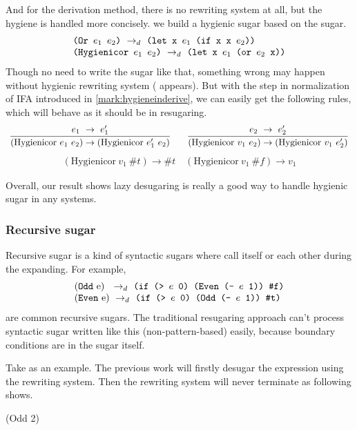 And for the derivation method, there is no rewriting system at all, but the hygiene is handled more concisely. we build a hygienic sugar  based on the  sugar.
\[
\begin{array}{l}
\texttt{(Or $e_1$ $e_2$)} ~\rightarrow_d~ \texttt{(let x $e_1$ (if x x $e_2$))}\\
\texttt{(Hygienicor $e_1$ $e_2$)} ~\rightarrow_d~ \texttt{(let x $e_1$ (or $e_2$ x))}
\end{array}
\]
Though no need to write the sugar like that, something wrong may happen without hygienic rewriting system ( appears). But with the step in normalization of IFA introduced in \ref{mark:hygieneinderive}, we can easily get the following rules, which will behave as it should be in resugaring.
\[
\begin{array}{c}
\infer {(\mbox{Hygienicor}~e_1~e_2) \rightarrow (\mbox{Hygienicor}~e_1'~e_2)} {e_1~ \rightarrow~e_1'}
\qquad
\infer {(\mbox{Hygienicor}~v_1~e_2) \rightarrow (\mbox{Hygienicor}~v_1~e_2')} {e_2~ \rightarrow~e_2'}
\end{array}\]
\[
\begin{array}{c}
(\mbox{Hygienicor}~v_1~\#t) \rightarrow \#t
\quad
(\mbox{Hygienicor}~v_1~\#f) \rightarrow v_1
\end{array}
\]

Overall, our result shows lazy desugaring is really a good way to handle hygienic sugar in any systems.

\subsubsection{Recursive sugar}
\label{sec:recursiveSugar}

Recursive sugar is a kind of syntactic sugars where call itself or each other during the expanding. For example,
\[
\begin{array}{l}
\drule{(\m{Odd}~$e$)~}{\Code{(if (> $e$ 0) (Even (- $e$ 1)) \false)}}\\
\drule{(\m{Even}~$e$)}{\Code{(if (> $e$ 0) (Odd (- $e$ 1)) \true)}}
\end{array}
\]
are common recursive sugars. The traditional resugaring approach can't process syntactic sugar written like this (non-pattern-based) easily, because boundary conditions are in the sugar itself.

Take  as an example. The previous work will firstly desugar the expression using the rewriting system. Then the rewriting system will never terminate as following shows.
\begin{scriptsize}
\begin{Codes}
   (Odd 2)
\end{Codes}
\end{scriptsize}



